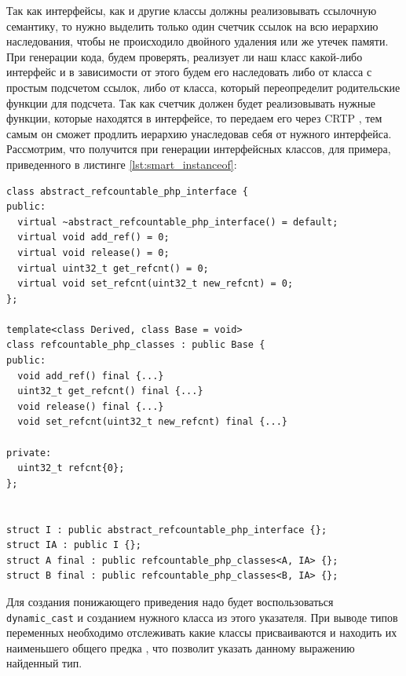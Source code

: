 Так как интерфейсы, как и другие классы должны реализовывать ссылочную семантику, то нужно выделить только один счетчик ссылок на всю иерархию наследования, чтобы не происходило двойного удаления или же утечек памяти.
При генерации кода, будем проверять, реализует ли наш класс какой-либо интерфейс и в зависимости от этого будем его наследовать либо от класса с простым подсчетом ссылок, либо от класса, который переопределит родительские функции для подсчета.
Так как счетчик должен будет реализовывать нужные функции, которые находятся в интерфейсе, то передаем его через CRTP \cite{crtp}, тем самым он сможет продлить иерархию унаследовав себя от нужного интерфейса.
Рассмотрим, что получится при генерации интерфейсных классов, для примера, приведенного в листинге \ref{lst:smart_instanceof}:
\begin{lstlisting}
class abstract_refcountable_php_interface {
public:
  virtual ~abstract_refcountable_php_interface() = default;
  virtual void add_ref() = 0;
  virtual void release() = 0;
  virtual uint32_t get_refcnt() = 0;
  virtual void set_refcnt(uint32_t new_refcnt) = 0;
};

template<class Derived, class Base = void>
class refcountable_php_classes : public Base {
public:
  void add_ref() final {...}
  uint32_t get_refcnt() final {...}
  void release() final {...}
  void set_refcnt(uint32_t new_refcnt) final {...}

private:
  uint32_t refcnt{0};
};


struct I : public abstract_refcountable_php_interface {};
struct IA : public I {};
struct A final : public refcountable_php_classes<A, IA> {};
struct B final : public refcountable_php_classes<B, IA> {};
\end{lstlisting}

Для создания понижающего приведения надо будет воспользоваться \verb|dynamic_cast| и созданием нужного класса из этого указателя.
При выводе типов переменных необходимо отслеживать какие классы присваиваются и находить их наименьшего общего предка \cite{lca}, что позволит указать данному выражению найденный тип.

